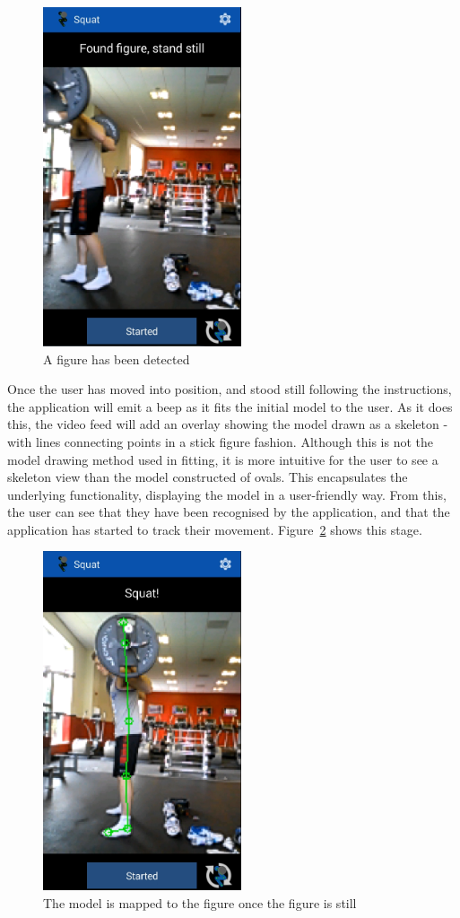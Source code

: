 \begin{figure}[H]
    \centering
	\includegraphics[height=10cm]{application/images/foundfigure}
\caption{A figure has been detected}
\label{fig:foundfigure}
\end{figure}

Once the user has moved into position, and stood still following the instructions, the application will emit a beep as it fits the initial model to the user. As it does this, the video feed will add an overlay showing the model drawn as a skeleton - with lines connecting points in a stick figure fashion. Although this is not the model drawing method used in fitting, it is more intuitive for the user to see a skeleton view than the model constructed of ovals. This encapsulates the underlying functionality, displaying the model in a user-friendly way. From this, the user can see that they have been recognised by the application, and that the application has started to track their movement. Figure~\ref{fig:startsquatting} shows this stage.

\begin{figure}[H]
    \centering
	\includegraphics[height=10cm]{application/images/startsquatting}
\caption{The model is mapped to the figure once the figure is still}
\label{fig:startsquatting}
\end{figure}

